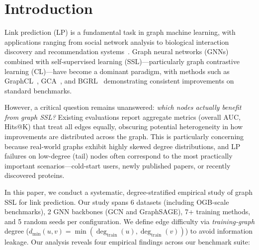\section{Introduction}
\label{sec:intro}

Link prediction (LP) is a fundamental task in graph machine learning, with applications ranging from social network analysis to biological interaction discovery and recommendation systems~\cite{zhang2018link}. Graph neural networks (GNNs) combined with self-supervised learning (SSL)---particularly graph contrastive learning (CL)---have become a dominant paradigm, with methods such as GraphCL~\cite{you2020graph}, GCA~\cite{zhu2021graph}, and BGRL~\cite{thakoor2022large} demonstrating consistent improvements on standard benchmarks.

However, a critical question remains unanswered: \emph{which nodes actually benefit from graph SSL?} Existing evaluations report aggregate metrics (overall AUC, Hits@K) that treat all edges equally, obscuring potential heterogeneity in how improvements are distributed across the graph. This is particularly concerning because real-world graphs exhibit highly skewed degree distributions, and LP failures on low-degree (tail) nodes often correspond to the most practically important scenarios---cold-start users, newly published papers, or recently discovered proteins.

In this paper, we conduct a systematic, degree-stratified empirical study of graph SSL for link prediction. Our study spans 6 datasets (including OGB-scale benchmarks), 2 GNN backbones (GCN and GraphSAGE), 7+ training methods, and 5 random seeds per configuration. We define edge difficulty via \emph{training-graph} degree ($d_{\min}(u,v) = \min(\deg_{\text{train}}(u), \deg_{\text{train}}(v))$) to avoid information leakage. Our analysis reveals four empirical findings across our benchmark suite:

